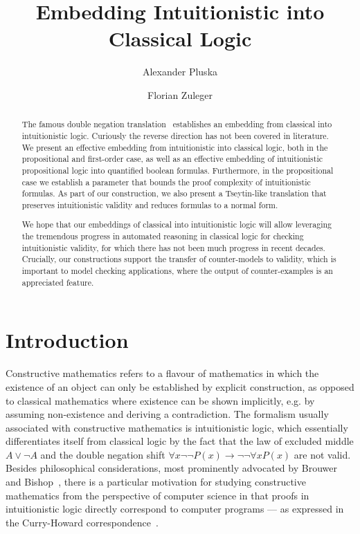 \documentclass[a4paper,UKenglish,cleveref, autoref, thm-restate]{lipics-v2021}
\title{Embedding Intuitionistic into Classical Logic} %
\author{Alexander {Pluska}}{Faculty of Mathematics, Universtät Wien, Austria}{e11941874@student.tuwien.ac.at}{https://orcid.org/my-orcid?orcid=0000-0002-7709-3335}{}%
\author{Florian Zuleger}{Institute of Logic and Computation, Technische Universität Wien, Austria}{florian.zuleger@tuwien.ac.at}{https://orcid.org/0000-0003-1468-8398}{}
\begin{document}
\maketitle

\begin{abstract}
The famous double negation translation~\cite{glivenko1929quelques, godel1933intuitionistischen} establishes an embedding from classical into intuitionistic logic. Curiously the reverse direction has not been covered in literature. We present an effective embedding from intuitionistic into classical logic, both in the propositional and first-order case, as well as an effective embedding of intuitionistic propositional logic into quantified boolean formulas.
Furthermore, in the propositional case we establish a parameter that bounds the proof complexity of intuitionistic formulas. As part of our construction, we also present a Tseytin-like translation that preserves intuitionistic validity and reduces formulas to a normal form.



We hope that our embeddings of classical into intuitionistic logic will allow leveraging the tremendous progress in automated reasoning in classical logic for checking intuitionistic validity, for which there has not been much progress in recent decades. Crucially, our constructions support the transfer of counter-models to validity, which is important to model checking applications, where the output of counter-examples is an appreciated feature.
\end{abstract}

\section{Introduction}


Constructive mathematics refers to a flavour of mathematics in which the existence of an object can only be established by explicit construction, as opposed to classical mathematics where existence can be shown implicitly, e.g. by assuming non-existence and deriving a contradiction.
The formalism usually associated with constructive mathematics is intuitionistic logic, which essentially differentiates itself from classical logic by the fact that the law of excluded middle $A\vee\neg A$ and the double negation shift $\forall x\neg\neg P(x)\to\neg\neg\forall xP(x)$ are not valid.
Besides philosophical considerations, most prominently advocated by Brouwer~\cite{brouwer1907over} and Bishop~\cite{bishop1967foundations}, there is a particular motivation for studying constructive mathematics from the perspective of computer science in that proofs in  intuitionistic logic directly correspond to computer programs --- as expressed in the Curry-Howard correspondence~\cite{howard1980formulae}.
\end{document}
